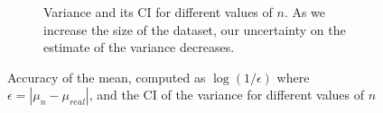 \documentclass[twoside,onecolumn]{article}
\theoremstyle{definition}
\begin{document}
\begin{figure}
\begin{subfigure}{0.5\textwidth}
         \caption{Variance and its CI for different values of $n$. As we increase the size of the dataset, our uncertainty on the estimate of the variance decreases.}
         \label{fig:N_norm_var}
     \end{subfigure}
  \caption{Accuracy of the mean, computed as $\log(1/\epsilon)$ where $\epsilon=|\mu_n-\mu_{real}|$, and the CI of the variance for different values of $n$}\label{fig:N_norm}
\end{figure}
\end{document}
